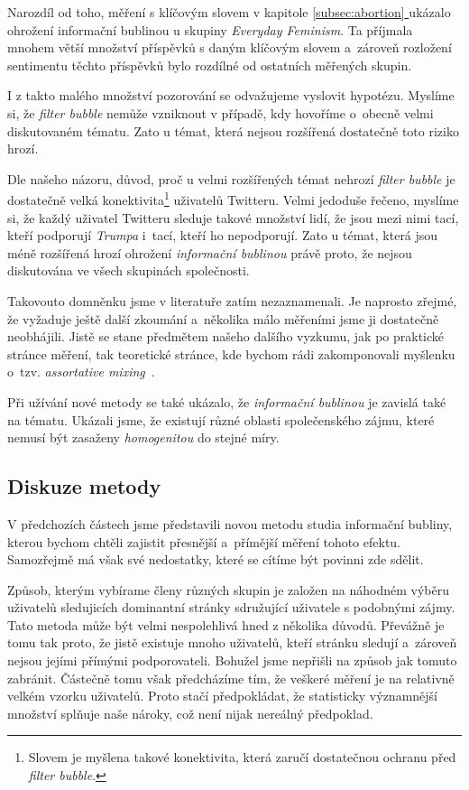 \documentclass[12pt, a4paper]{article}
\newcommand*{\fullref}[1]{\hyperref[{#1}]{\ref*{#1} \nameref*{#1}}} %
\numberwithin{equation}{section} 	%
\begin{document}
Narozdíl od toho, měření s klíčovým slovem \textit{} v kapitole \fullref{subsec:abortion} ukázalo ohrožení informační bublinou u skupiny \textit{Everyday Feminism}. Ta příjmala mnohem větší množství příspěvků s daným klíčovým slovem a~zároveň rozložení sentimentu těchto příspěvků bylo rozdílné od ostatních měřených skupin.

I z takto malého množství pozorování se odvažujeme vyslovit hypotézu. My\-slí\-me si, že \textit{filter bubble} nemůže vzniknout v případě, kdy hovoříme o~obecně velmi diskutovaném tématu. Zato u témat, která nejsou rozšířená dostatečně toto riziko hrozí.

Dle našeho názoru, důvod, proč u velmi rozšířených témat nehrozí \textit{filter bubble} je dostatečně velká konektivita\footnote{Slovem \textit{} je myšlena takové konektivita, která zaručí dostatečnou ochranu před \textit{filter bubble}.} uživatelů Twitteru. Velmi jedoduše řečeno, my\-slí\-me si, že každý uživatel Twitteru sleduje takové množství lidí, že jsou mezi nimi tací, kteří podporují \textit{Trumpa} i~tací, kteří ho nepodporují. Zato u témat, která jsou méně rozšířená hrozí ohrožení \textit{informační bublinou} právě proto, že nejsou diskutována ve všech skupinách společnosti.

Takovouto domněnku jsme v literatuře zatím nezaznamenali. Je naprosto zřejmé, že vyžaduje ještě další zkoumání a~několika málo měřeními jsme ji dostatečně neobhájili. Jistě se stane předmětem našeho dalšího vyzkumu, jak po praktické stránce měření, tak teoretické stránce, kde bychom rádi zakomponovali myšlenku o~tzv. \textit{assortative mixing}~\cite{AssortativeMixing-soc, AssortativeMixing-E}.

Při užívání nové metody se také ukázalo, že \textit{informační bublinou} je zavislá také na tématu. Ukázali jsme, že existují různé oblasti společenského zájmu, které nemusí být zasaženy \textit{homogenitou} do stejné míry.

\subsection{Diskuze metody}
\noindent V předchozích částech jsme představili novou metodu studia informační bubliny, kterou bychom chtěli zajistit přesnější a~přímější měření tohoto efektu. Samozřejmě má však své nedostatky, které se cítíme být povinni zde sdělit.

Způsob, kterým vybírame členy různých skupin je založen na náhodném vý\-bě\-ru uživatelů sledujicích dominantní stránky sdružující uživatele s podobnými zájmy. Tato metoda může být velmi nespolehlivá hned z několika důvodů. Pře\-váž\-ně je tomu tak proto, že jistě existuje mnoho uživatelů, kteří stránku sledují a~zároveň nejsou jejími přímými podporovateli. Bohužel jsme nepřišli na způsob jak tomuto zabránit. Částečně tomu však předcházíme tím, že veškeré měření je na relativně velkém vzorku uživatelů. Proto stačí předpokládat, že statisticky významnější množství splňuje naše nároky, což není nijak nereálný předpoklad.
\end{document}
